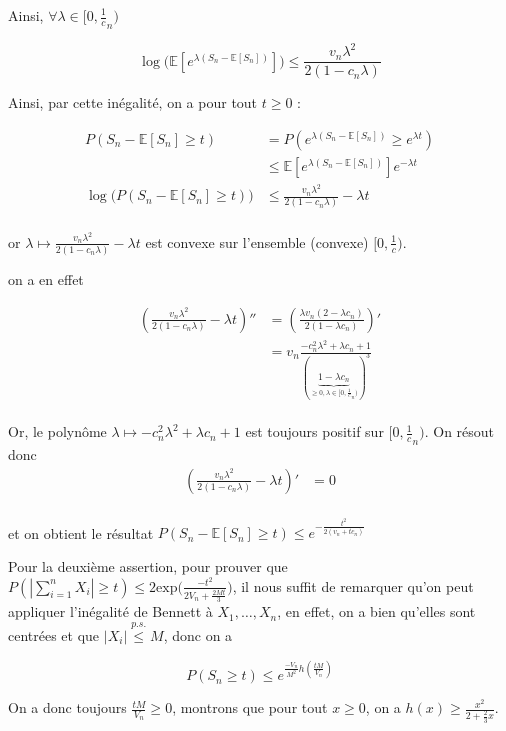 \documentclass[12pt]{article}
\newcommand{\petitespace}{\vspace{0.5cm}}
\newcommand{\cercler}[1]{\tikz[baseline=(char.base)]{\node[shape=circle,draw,inner sep=1pt](char){#1};} }
\newcommand{\bb}[1]{\mathbb{#1}} %
\newcommand{\somme}[2]{\sum\limits_{#1}^{#2}}
\newcommand{\Xunan}{X_1,\ldots,X_n} %
\newcommand{\esp}[1]{\bb{ E} \mathopen{}\left[#1\right]} %
\newcommand{\1}{\bb{1}} %
\begin{document}
{Ainsi, $\forall \lambda \in [0, \frac1c_n)$

$$\log\big(\esp{e^{\lambda(S_n-\esp{S_n})}}\big) \le \frac{v_n \lambda^2}{2(1-c_n\lambda)}$$

Ainsi, par cette inégalité, on a pour tout $t \ge 0$ :


\begin{align*}
	 P( S_n-\esp{S_n} \ge t) &=  P( e^{\lambda(S_n-\esp{S_n})} \ge e^{\lambda t}) \\
	& \le \esp{e^{\lambda(S_n-\esp{S_n})} } e^{-\lambda t} \\
	\log\big(  P( S_n-\esp{S_n} \ge t)  \big)&\le  \frac{v_n \lambda^2}{2(1-c_n\lambda)} -\lambda t \\
\end{align*}

or $\lambda \mapsto \frac{v_n \lambda^2}{2(1-c_n\lambda)} -\lambda t$ est convexe sur l'ensemble (convexe) $[0, \frac 1c)$.

on a en effet 

\begin{align*}
	 (\frac{v_n \lambda^2}{2(1-c_n\lambda)} -\lambda t)'' &= (\frac{\lambda v_n(2-\lambda c_n)}{2(1-\lambda c_n)})'\\
	 &=v_n \frac{-c_n^2\lambda^2+\lambda c_n+1}{(\underbrace{1-\lambda c_n}_{\ge 0, \lambda \in [0, \frac 1c_n)})^3}\\
\end{align*}

Or, le polynôme $\lambda \mapsto -c_n^2\lambda^2+\lambda c_n+1$ est toujours positif sur $[0, \frac 1c_n)$. On résout donc 
\begin{align*}
	 (\frac{v_n \lambda^2}{2(1-c_n\lambda)} -\lambda t)' &= 0\\
\end{align*}

et on obtient le résultat $P(S_n-\esp{S_n} \ge t) \le e^{-\frac{t^2}{2(v_n+tc_n)}}$ \petitespace


\cercler 2 Pour la deuxième assertion, pour prouver que $P(| \somme{i=1}{n}X_i|  \ge t)\le 2\text{exp}\big(\frac{-t^2}{2V_n + \frac{2Mt}{3}}\big)$, il nous suffit de remarquer qu'on peut appliquer l'inégalité de Bennett à $\Xunan$, en effet, on a bien qu'elles sont centrées et que $|X_i| \overset{p.s.}{\le} M$, donc on a 

$$ P(S_n \ge t) \le e^{\frac{-V_n}{M^2} h(\frac{tM}{V_n})}$$

On a donc toujours $\frac{tM}{V_n}\ge 0$, montrons que pour tout $x \ge 0$, on a $h(x) \ge \frac{x^2}{2+\frac{2}{3}x}$. 

}
\end{document}
